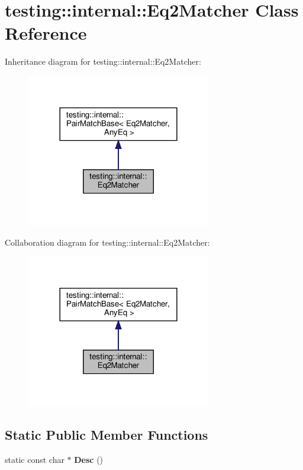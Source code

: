 \hypertarget{classtesting_1_1internal_1_1_eq2_matcher}{}\section{testing\+:\+:internal\+:\+:Eq2\+Matcher Class Reference}
\label{classtesting_1_1internal_1_1_eq2_matcher}


Inheritance diagram for testing\+:\+:internal\+:\+:Eq2\+Matcher\+:
\nopagebreak
\begin{figure}[H]
\begin{center}
\leavevmode
\includegraphics[width=228pt]{classtesting_1_1internal_1_1_eq2_matcher__inherit__graph}
\end{center}
\end{figure}


Collaboration diagram for testing\+:\+:internal\+:\+:Eq2\+Matcher\+:
\nopagebreak
\begin{figure}[H]
\begin{center}
\leavevmode
\includegraphics[width=228pt]{classtesting_1_1internal_1_1_eq2_matcher__coll__graph}
\end{center}
\end{figure}
\subsection*{Static Public Member Functions}
\begin{DoxyCompactItemize}
\item 
\mbox{\label{classtesting_1_1internal_1_1_eq2_matcher_a87c049778ac3d124641b21e47ef558dc}} 
static const char $\ast$ {\bfseries Desc} ()
\end{DoxyCompactItemize}
